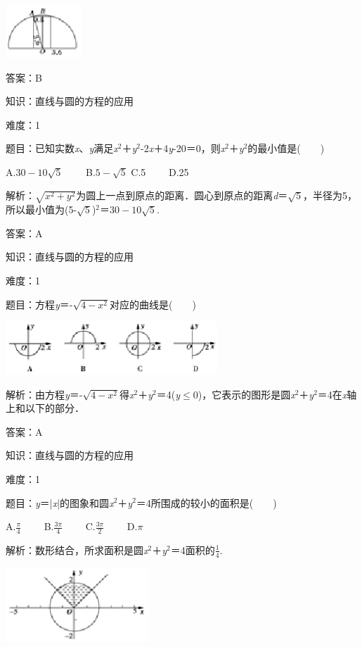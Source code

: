 \documentclass{article} %
\begin{document}
\includegraphics*[width=1.13in, height=0.77in, keepaspectratio=false]{image297}

答案：B

知识：直线与圆的方程的应用

难度：1

题目：已知实数\textit{x}、\textit{y}满足\textit{x}${}^{2}$＋\textit{y}${}^{2}$-2\textit{x}＋4\textit{y}-20＝0，则\textit{x}${}^{2}$＋\textit{y}${}^{2}$的最小值是(　　)

A.$30-10\sqrt{5}$　　 B.$5-\sqrt{5}$  C.5　　 D.25

解析：$\sqrt{x^2+y^2}$为圆上一点到原点的距离．圆心到原点的距离\textit{d}＝$\sqrt{5}$，半径为5，所以最小值为(5-$\sqrt{5}$)${}^{2}$＝$30-10\sqrt{5}$.

答案：A

知识：直线与圆的方程的应用

难度：1

题目：方程\textit{y}＝-$\sqrt{4-x^2}$对应的曲线是(　　)

\includegraphics*[width=3.14in, height=0.79in, keepaspectratio=false]{image298}

解析：由方程\textit{y}＝-$\sqrt{4-x^2}$得\textit{x}${}^{2}$＋\textit{y}${}^{2}$＝4(\textit{y}$\mathrm{\le}$0)，它表示的图形是圆\textit{x}${}^{2}$＋\textit{y}${}^{2}$＝4在\textit{x}轴上和以下的部分．

答案：A

知识：直线与圆的方程的应用

难度：1

题目：\textit{y}＝|\textit{x}|的图象和圆\textit{x}${}^{2}$＋\textit{y}${}^{2}$＝4所围成的较小的面积是(　　)

A.$\frac{\pi}{4}$　　 B.$\frac{3\pi}{4}$　　  C.$\frac{3\pi}{2}$　　 D.$\pi$

解析：数形结合，所求面积是圆\textit{x}${}^{2}$＋\textit{y}${}^{2}$＝4面积的$\frac{1}{4}$.

\includegraphics*[width=2.12in, height=1.10in, keepaspectratio=false]{image299}
\end{document}
